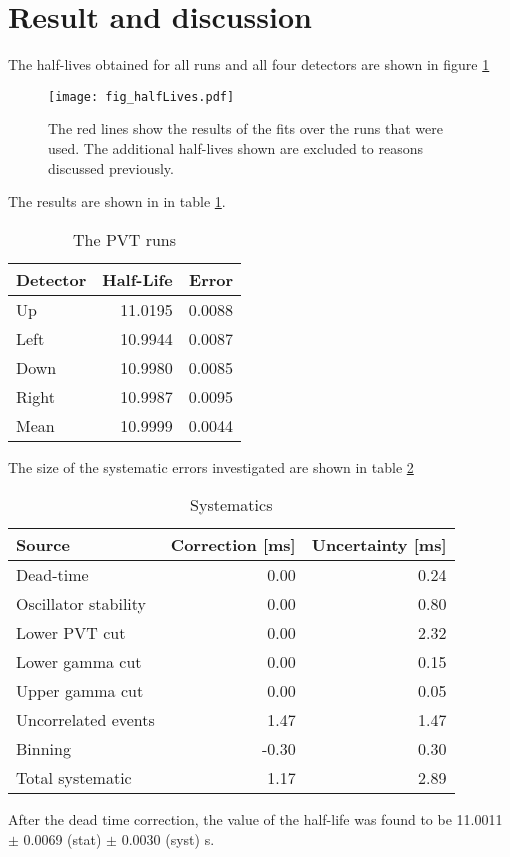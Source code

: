 \documentclass[MaxHughesThesis.tex]{subfiles}
\begin{document}
\section{Result and discussion}
\label{sec:result}

The half-lives obtained for all runs and all four detectors are shown in figure \ref{fig:PVT2by2}

\begin{figure}[!htb]
	\centerline{\texttt{[image: fig\_halfLives.pdf]}}
	\caption{The red lines show the results of the fits over the runs that were used.
		 The additional half-lives shown are excluded to reasons discussed previously. 
		}
	\label{fig:PVT2by2}
\end{figure}

The results  are shown in  in table \ref{tab:PVTTable}.

	\begin{table}[!hbt]
			\centering
			\caption{The PVT runs}
			\begin{tabular}{l|r|r}
			Detector & Half-Life & Error \\ \hline
			Up & 11.0195 & 0.0088 \\
			Left & 10.9944 & 0.0087 \\
			Down & 10.9980 & 0.0085 \\
			Right & 10.9987 & 0.0095 \\ \hline
			Mean & 10.9999 & 0.0044
			\end{tabular}
			\label{tab:PVTTable}
	\end{table}

The size of the systematic errors investigated are shown in table \ref{tab:SysTable} 

\begin{table}[!hbt]
	\caption{Systematics}
	\centering
	\label{tab:err-budget}
		\begin{tabular}{l|r|r}
		Source & Correction [ms] & Uncertainty [ms] \\ \hline
		Dead-time & 0.00 & 0.24 \\
		Oscillator stability & 0.00 & 0.80 \\
		Lower PVT cut & 0.00 & 2.32 \\
		Lower gamma cut & 0.00 &  0.15\\
		Upper gamma cut  & 0.00 & 0.05 \\ 
		Uncorrelated events & 1.47 & 1.47 \\
		Binning & -0.30 & 0.30 \\ \hline
		Total systematic & 1.17 & 2.89
		\end{tabular}
	\label{tab:SysTable}
\end{table}
After the dead time correction, the value of the half-life was found to be 11.0011 $\pm$ 0.0069 (stat) $\pm$ 0.0030 (syst) s.
\end{document}
